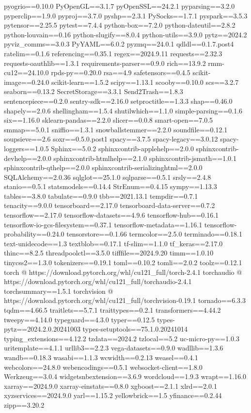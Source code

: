 pyogrio==0.10.0
PyOpenGL==3.1.7
pyOpenSSL==24.2.1
pyparsing==3.2.0
pyperclip==1.9.0
pyproj==3.7.0
pyshp==2.3.1
PySocks==1.7.1
pyspark==3.5.3
pytensor==2.25.5
pytest==7.4.4
python-box==7.2.0
python-dateutil==2.8.2
python-louvain==0.16
python-slugify==8.0.4
python-utils==3.9.0
pytz==2024.2
pyviz_comms==3.0.3
PyYAML==6.0.2
pyzmq==24.0.1
qdldl==0.1.7.post4
ratelim==0.1.6
referencing==0.35.1
regex==2024.9.11
requests==2.32.3
requests-oauthlib==1.3.1
requirements-parser==0.9.0
rich==13.9.2
rmm-cu12==24.10.0
rpds-py==0.20.0
rsa==4.9
safetensors==0.4.5
scikit-image==0.24.0
scikit-learn==1.5.2
scipy==1.13.1
scooby==0.10.0
scs==3.2.7
seaborn==0.13.2
SecretStorage==3.3.1
Send2Trash==1.8.3
sentencepiece==0.2.0
sentry-sdk==2.16.0
setproctitle==1.3.3
shap==0.46.0
shapely==2.0.6
shellingham==1.5.4
shutilwhich==1.1.0
simple-parsing==0.1.6
six==1.16.0
sklearn-pandas==2.2.0
slicer==0.0.8
smart-open==7.0.5
smmap==5.0.1
sniffio==1.3.1
snowballstemmer==2.2.0
soundfile==0.12.1
soupsieve==2.6
soxr==0.5.0.post1
spacy==3.7.5
spacy-legacy==3.0.12
spacy-loggers==1.0.5
Sphinx==5.0.2
sphinxcontrib-applehelp==2.0.0
sphinxcontrib-devhelp==2.0.0
sphinxcontrib-htmlhelp==2.1.0
sphinxcontrib-jsmath==1.0.1
sphinxcontrib-qthelp==2.0.0
sphinxcontrib-serializinghtml==2.0.0
SQLAlchemy==2.0.36
sqlglot==25.1.0
sqlparse==0.5.1
srsly==2.4.8
stanio==0.5.1
statsmodels==0.14.4
StrEnum==0.4.15
sympy==1.13.3
tables==3.8.0
tabulate==0.9.0
tbb==2021.13.1
tempdir==0.7.1
tenacity==9.0.0
tensorboard==2.17.0
tensorboard-data-server==0.7.2
tensorflow==2.17.0
tensorflow-datasets==4.9.6
tensorflow-hub==0.16.1
tensorflow-io-gcs-filesystem==0.37.1
tensorflow-metadata==1.16.1
tensorflow-probability==0.24.0
tensorstore==0.1.66
termcolor==2.5.0
terminado==0.18.1
text-unidecode==1.3
textblob==0.17.1
tf-slim==1.1.0
tf_keras==2.17.0
thinc==8.2.5
threadpoolctl==3.5.0
tifffile==2024.9.20
timm==1.0.10
tinycss2==1.3.0
tokenizers==0.19.1
toml==0.10.2
tomli==2.0.2
toolz==0.12.1
torch @ https://download.pytorch.org/whl/cu121_full/torch-2.4.1%
torchaudio @ https://download.pytorch.org/whl/cu121_full/torchaudio-2.4.1%
torchsummary==1.5.1
torchvision @ https://download.pytorch.org/whl/cu121_full/torchvision-0.19.1%
tornado==6.3.3
tqdm==4.66.5
traitlets==5.7.1
traittypes==0.2.1
transformers==4.44.2
tweepy==4.14.0
typeguard==4.3.0
typer==0.12.5
types-pytz==2024.2.0.20241003
types-setuptools==75.1.0.20241014
typing_extensions==4.12.2
tzdata==2024.2
tzlocal==5.2
uc-micro-py==1.0.3
uritemplate==4.1.1
urllib3==2.2.3
vega-datasets==0.9.0
wadllib==1.3.6
wandb==0.18.3
wasabi==1.1.3
wcwidth==0.2.13
weasel==0.4.1
webcolors==24.8.0
webencodings==0.5.1
websocket-client==1.8.0
Werkzeug==3.0.4
widgetsnbextension==3.6.9
wordcloud==1.9.3
wrapt==1.16.0
xarray==2024.9.0
xarray-einstats==0.8.0
xgboost==2.1.1
xlrd==2.0.1
xyzservices==2024.9.0
yarl==1.15.2
yellowbrick==1.5
yfinance==0.2.44
zipp==3.20.2
